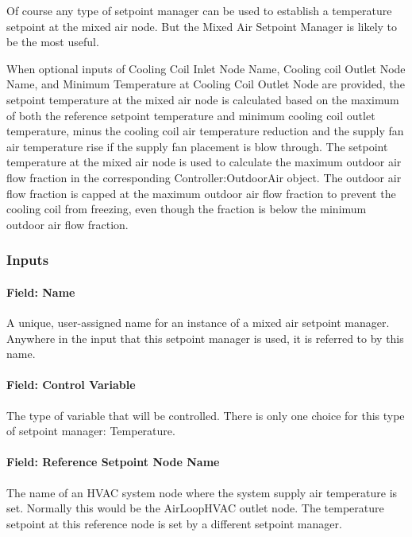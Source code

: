 Of course any type of setpoint manager can be used to establish a temperature setpoint at the mixed air node. But the Mixed Air Setpoint Manager is likely to be the most useful.

When optional inputs of Cooling Coil Inlet Node Name, Cooling coil Outlet Node Name, and Minimum Temperature at Cooling Coil Outlet Node are provided, the setpoint temperature at the mixed air node is calculated based on the maximum of both the reference setpoint temperature and minimum cooling coil outlet temperature, minus the cooling coil air temperature reduction and the supply fan air temperature rise if the supply fan placement is blow through. The setpoint temperature at the mixed air node is used to calculate the maximum outdoor air flow fraction in the corresponding Controller:OutdoorAir object. The outdoor air flow fraction is capped at the maximum outdoor air flow fraction to prevent the cooling coil from freezing, even though the fraction is below the minimum outdoor air flow fraction.

\subsubsection{Inputs}\label{inputs-8-022}

\paragraph{Field: Name}\label{field-name-8-019}

A unique, user-assigned name for an instance of a mixed air setpoint manager. Anywhere in the input that this setpoint manager is used, it is referred to by this name.

\paragraph{Field: Control Variable}\label{field-control-variable-8}

The type of variable that will be controlled. There is only one choice for this type of setpoint manager: Temperature.

\paragraph{Field: Reference Setpoint Node Name}\label{field-reference-setpoint-node-name}

The name of an HVAC system node where the system supply air temperature is set. Normally this would be the AirLoopHVAC outlet node. The temperature setpoint at this reference node is set by a different setpoint manager.

